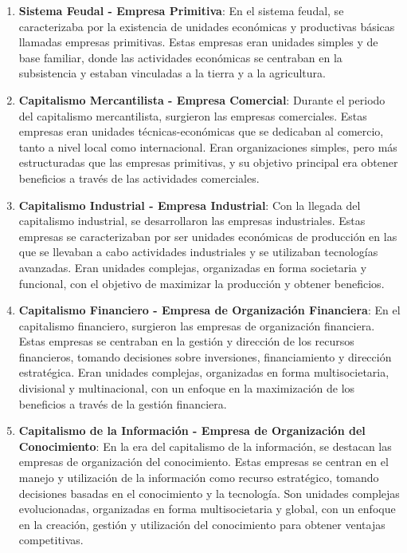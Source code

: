 \documentclass[
  man,
  floatsintext,
  longtable,
  a4paper,
  nolmodern,
  notxfonts,
  notimes,
  12pt,
  colorlinks=true,linkcolor=blue,citecolor=blue,urlcolor=blue]{apa7}
\begin{document}
\begin{enumerate}
\def\labelenumi{\arabic{enumi}.}
\item
  \textbf{Sistema Feudal - Empresa Primitiva}: En el sistema feudal, se
  caracterizaba por la existencia de unidades económicas y productivas
  básicas llamadas empresas primitivas. Estas empresas eran unidades
  simples y de base familiar, donde las actividades económicas se
  centraban en la subsistencia y estaban vinculadas a la tierra y a la
  agricultura.
\item
  \textbf{Capitalismo Mercantilista - Empresa Comercial}: Durante el
  periodo del capitalismo mercantilista, surgieron las empresas
  comerciales. Estas empresas eran unidades técnicas-económicas que se
  dedicaban al comercio, tanto a nivel local como internacional. Eran
  organizaciones simples, pero más estructuradas que las empresas
  primitivas, y su objetivo principal era obtener beneficios a través de
  las actividades comerciales.
\item
  \textbf{Capitalismo Industrial - Empresa Industrial}: Con la llegada
  del capitalismo industrial, se desarrollaron las empresas
  industriales. Estas empresas se caracterizaban por ser unidades
  económicas de producción en las que se llevaban a cabo actividades
  industriales y se utilizaban tecnologías avanzadas. Eran unidades
  complejas, organizadas en forma societaria y funcional, con el
  objetivo de maximizar la producción y obtener beneficios.
\item
  \textbf{Capitalismo Financiero - Empresa de Organización Financiera}:
  En el capitalismo financiero, surgieron las empresas de organización
  financiera. Estas empresas se centraban en la gestión y dirección de
  los recursos financieros, tomando decisiones sobre inversiones,
  financiamiento y dirección estratégica. Eran unidades complejas,
  organizadas en forma multisocietaria, divisional y multinacional, con
  un enfoque en la maximización de los beneficios a través de la gestión
  financiera.
\item
  \textbf{Capitalismo de la Información - Empresa de Organización del
  Conocimiento}: En la era del capitalismo de la información, se
  destacan las empresas de organización del conocimiento. Estas empresas
  se centran en el manejo y utilización de la información como recurso
  estratégico, tomando decisiones basadas en el conocimiento y la
  tecnología. Son unidades complejas evolucionadas, organizadas en forma
  multisocietaria y global, con un enfoque en la creación, gestión y
  utilización del conocimiento para obtener ventajas competitivas.
\end{enumerate}
\end{document}
